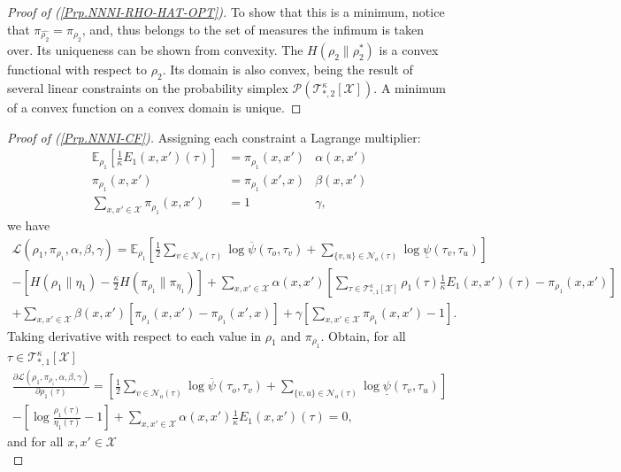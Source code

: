 \documentclass[12pt]{article}
\newcommand{\wh}[1]{\widehat{#1}}
\newcommand{\X}{{\mathcal{X}}}
\newcommand{\PP}{{\mathcal{P}}}
\newcommand{\TT}{{\mathcal{T}}}
\newcommand{\EE}{{\mathbb{E}}}
\newcommand{\PO}{{\overline{\psi}}}
\newcommand{\PU}{{\underline{\psi}}}
\newcommand{\LM}{{\mathcal{L}}}
\newcommand{\tree}[2]{\TT_{*, #1}^{#2}[\X]}
\newcommand{\Sl}{{\rho_2}}
\newcommand{\Ss}{{\rho_1}}
\newcommand{\SUs}{{\eta_1}}
\newcommand{\Es}{{\pi_\Ss}}
\newcommand{\EUs}{{\pi_\SUs}}
\newcommand{\NB}[1]{{\mathcal{N}_o(#1)}}
\numberwithin{equation}{section}
\begin{document}
\begin{proof}[Proof of (\ref{Prp.NNNI-RHO-HAT-OPT})]
    To show that this is a minimum, notice that $\pi_{\wh{\rho_2}} = \pi_{\rho_2}$, and, thus belongs to the set of measures the infimum is taken over. Its uniqueness can be shown from convexity. The $H(\rho_2\| \rho_2^*)$ is a convex functional with respect to $\Sl$. Its domain is also convex, being the result of several linear constraints on the probability simplex $\PP(\tree{2}{\kappa})$. A minimum of a convex function on a
    convex domain is unique.
\end{proof}

\newpage

\begin{proof}[Proof of (\ref{Prp.NNNI-CF})]
    Assigning each constraint a Lagrange multiplier:
    \begin{align*}
        \EE_\Ss\left[\frac1\kappa E_1(x, x')(\tau)\right] & = \Es(x, x') & \alpha(x, x') \\
        \Es(x, x')                                        & = \Es(x', x) & \beta(x, x')  \\
        \sum_{x,x'\in\X}\Es(x, x')                        & = 1          & \gamma,
    \end{align*}
    we have
    \begin{multline*}
        \LM(\Ss, \Es, \alpha, \beta, \gamma) = \EE_\Ss\left[\frac12\sum_{v\in\NB{\tau}}\log\PO(\tau_o, \tau_v)+\sum_{\{v, u\}\in\NB{\tau}}\log\PU(\tau_v, \tau_u)\right]  \\
        - \left[H(\Ss\|\SUs) - \frac{\kappa}{2} H(\Es\|\EUs)\right] + \sum_{x, x'\in\X}\alpha(x, x')\left[\sum_{\tau\in\tree{1}{\kappa}}\Ss(\tau)\frac1\kappa E_1(x,x')(\tau) - \Es(x,x')\right] \\
        + \sum_{x, x'\in\X} \beta(x, x')\left[\Es(x, x')-\Es(x',x)\right] + \gamma\left[\sum_{x, x'\in\X} \Es(x, x') - 1\right].
    \end{multline*}
    Taking derivative with respect to each value in $\Ss$ and $\Es$. Obtain, for all $\tau\in\tree{1}{\kappa}$
    \begin{multline}\label{Eq.NNNI-LM-SS}
        \frac{\partial \LM(\Ss, \Es, \alpha, \beta, \gamma)}{\partial \Ss(\tau)} = \left[\frac12\sum_{v\in\NB{\tau}}\log\PO(\tau_o, \tau_v)+\sum_{\{v, u\}\in\NB{\tau}}\log\PU(\tau_v, \tau_u)\right]\\
        - \left[\log \frac{\Ss(\tau)}{\SUs(\tau)} - 1\right] + \sum_{x, x'\in\X}\alpha(x, x')\frac1\kappa E_1(x, x')(\tau) = 0,
    \end{multline}
    and for all $x, x'\in\X$
    \begin{equation}\label{Eq.NNNI-LM-ES}

\end{equation}
\end{proof}
\end{document}
